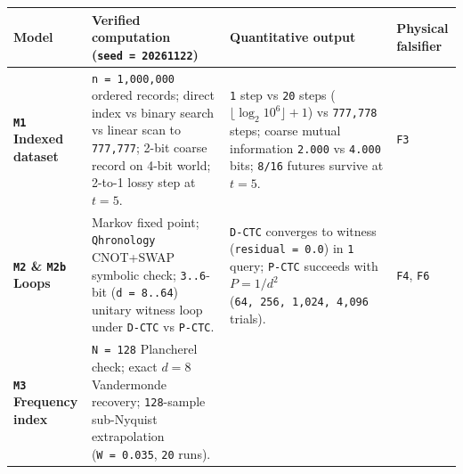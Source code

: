 \documentclass[10pt,letterpaper]{article}
\newcounter{none}
\begin{document}
{\def\LTcaptype{none} %
{\footnotesize\setlength{\tabcolsep}{3.8pt}\renewcommand{\arraystretch}{1.15}
\begin{longtable}[]{@{}
  >{\raggedright\arraybackslash}p{}
  >{\raggedright\arraybackslash}p{}
  >{\raggedright\arraybackslash}p{}
  >{\raggedright\arraybackslash}p{}@{}}
\toprule\noalign{}
\begin{minipage}[b]{\linewidth}\raggedright
\textbf{Model}
\end{minipage} & \begin{minipage}[b]{\linewidth}\raggedright
\textbf{Verified computation (\texttt{seed\ =\ 20261122})}
\end{minipage} & \begin{minipage}[b]{\linewidth}\raggedright
\textbf{Quantitative output}
\end{minipage} & \begin{minipage}[b]{\linewidth}\raggedright
\textbf{Physical falsifier}
\end{minipage} \\
\midrule\noalign{}
\endhead
\bottomrule\noalign{}
\endlastfoot
\textbf{\texttt{M1} Indexed dataset} & \texttt{n\ =\ 1,\allowbreak{}000,\allowbreak{}000} ordered
records; direct index vs binary search vs linear scan to
\texttt{777,777}; 2-bit coarse record on 4-bit world; 2-to-1 lossy step
at \(t=5\). & \texttt{1} step vs \texttt{20} steps
(\(\lfloor \log_2 10^6 \rfloor + 1\)) vs \texttt{777,778} steps; coarse
mutual information \texttt{2.000} vs \texttt{4.000} bits; \texttt{8/16}
futures survive at \(t=5\). & \texttt{F3} \\
\textbf{\texttt{M2} \& \texttt{M2b} Loops} & Markov fixed point;
\texttt{Qhronology} CNOT+SWAP symbolic check; \texttt{3..6}-bit
(\texttt{d\ =\ 8.\allowbreak{}.\allowbreak{}64}) unitary witness loop under \texttt{D-CTC} vs
\texttt{P-CTC}. & \texttt{D-CTC} converges to witness
(\texttt{residual\ =\ 0.\allowbreak{}0}) in \texttt{1} query; \texttt{P-CTC} succeeds
with \(P = 1/d^2\) (\texttt{64,\allowbreak{}\ 256,\allowbreak{}\ 1,\allowbreak{}024,\allowbreak{}\ 4,\allowbreak{}096} trials). &
\texttt{F4}, \texttt{F6} \\
\textbf{\texttt{M3} Frequency index} & \texttt{N\ =\ 128} Plancherel
check; exact \(d = 8\) Vandermonde recovery; \texttt{128}-sample
sub-Nyquist extrapolation (\texttt{W\ =\ 0.\allowbreak{}035}, \texttt{20} runs). &

\end{longtable}}}
\end{document}
